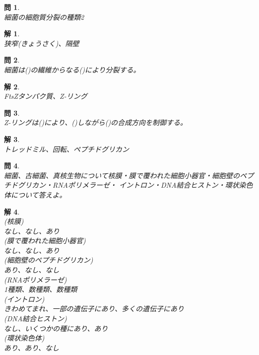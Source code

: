 \documentclass{jsarticle}
\newtheorem{pro}{問}[section]
\newtheorem{ans}{解}[section]
\begin{document}
\begin{pro}~\\
    細菌の細胞質分裂の種類2
\end{pro}
\begin{ans}~\\
    狭窄(きょうさく)、隔壁
\end{ans}

\begin{pro}~\\
    細菌は(\hspace{5mm})の繊維からなる(\hspace{5mm})により分裂する。
\end{pro}
\begin{ans}~\\
FtsZタンパク質、Z-リング
\end{ans}

\begin{pro}~\\
    Z-リングは(\hspace{5mm})により、(\hspace{5mm})しながら(\hspace{5mm})の合成方向を制御する。
\end{pro}
\begin{ans}~\\
    トレッドミル、回転、ペプチドグリカン
\end{ans}

\begin{pro}~\\
    細菌、古細菌、真核生物について核膜・膜で覆われた細胞小器官・細胞壁のペプチドグリカン・RNAポリメラーゼ・
    イントロン・DNA結合ヒストン・環状染色体について答えよ。
\end{pro}
\begin{ans}~\\
    (核膜)\\
    なし、なし、あり\\
    (膜で覆われた細胞小器官)\\
    なし、なし、あり\\
    (細胞壁のペプチドグリカン)\\
    あり、なし、なし\\
    (RNAポリメラーゼ)\\
    1種類、数種類、数種類\\
    (イントロン)\\
    きわめてまれ、一部の遺伝子にあり、多くの遺伝子にあり\\
    (DNA結合ヒストン)\\
    なし、いくつかの種にあり、あり\\
    (環状染色体)\\
    あり、あり、なし\\
\end{ans}
\end{document}
